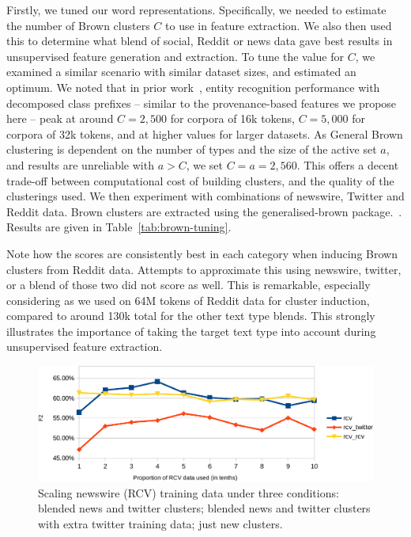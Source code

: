 \documentclass[review]{elsarticle}
\begin{document}
Firstly, we tuned our word representations.
Specifically, we needed to estimate the number of Brown clusters $C$ to use in feature extraction.
We also then used this to determine what blend of social, Reddit or news data gave best results in unsupervised feature generation and extraction.
To tune the value for $C$, we examined a similar scenario with similar dataset sizes, and estimated an optimum.
We noted that in prior work~\cite{derczynski2015tune}, entity recognition performance with decomposed class prefixes -- similar to the provenance-based features we propose here -- peak at around $C=2,500$ for corpora of 16k tokens, $C=5,000$ for corpora of 32k tokens, and at higher values for larger datasets.
As General Brown clustering is dependent on the number of types and the size of the active set $a$, and results are unreliable with $a>C$, we set $C = a = 2,560$.
This offers a decent trade-off between computational cost of building clusters, and the quality of the clusterings used.
We then experiment with combinations of newswire, Twitter and Reddit data.
Brown clusters are extracted using the generalised-brown package.~\cite{sean_chester_2015_33758}.
Results are given in Table~\ref{tab:brown-tuning}.

Note how the scores are consistently best in each category when inducing Brown clusters from Reddit data.
Attempts to approximate this using newswire, twitter, or a blend of those two did not score as well.
This is remarkable, especially considering as we used on 64M tokens of Reddit data for cluster induction, compared to around 130k total for the other text type blends.
This strongly illustrates the importance of taking the target text type into account during unsupervised feature extraction.



\begin{figure}
\centering
\includegraphics[width=0.79\columnwidth]{entity-chunking/chart-results-rcv-crop.pdf}
\caption{Scaling newswire (RCV) training data under three conditions: blended news and twitter clusters; blended news and twitter clusters with extra twitter training data; just new clusters.}
\label{fig:rcv-scaling}
\end{figure}
\end{document}
